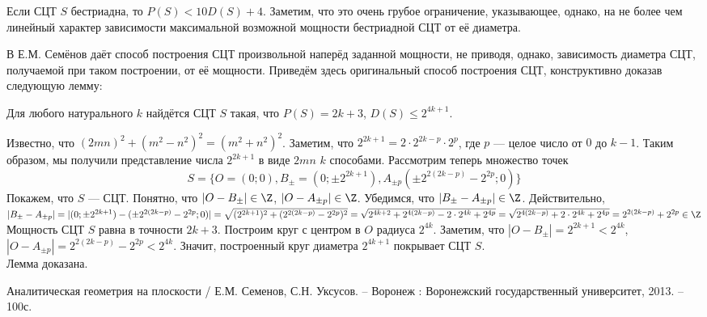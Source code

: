 \begin{sledstvie}
	Если СЦТ $S$ бестриадна, то
	$P(S) < 10 D(S)+4$.
	Заметим, что это очень грубое ограничение, указывающее, однако,
	на не более чем линейный характер зависимости максимальной возможной мощности  бестриадной СЦТ от её диаметра.
\end{sledstvie}

В \cite{angem1kurs} Е.М. Семёнов даёт способ построения СЦТ произвольной наперёд заданной мощности, не приводя, однако, зависимость диаметра СЦТ, получаемой при таком построении, от её мощности.
Приведём здесь оригинальный способ построения СЦТ, конструктивно доказав следующую лемму:

\begin{lemma}
	Для любого натурального $k$ найдётся СЦТ $S$ такая, что $P(S)=2k+3$, $D(S)\leq 2^{4k+1}$.
\end{lemma}

\dokvo
	Известно, что $(2mn)^2+(m^2-n^2)^2=(m^2+n^2)^2$.
	Заметим, что $2^{2k+1} = 2 \cdot 2^{2k-p} \cdot 2^p$, где $p$ --- целое число от $0$ до $k-1$.
	Таким образом, мы получили представление числа $2^{2k+1}$ в виде $2mn$ $k$ способами.
	Рассмотрим теперь множество точек
	$$
		S=\{O=(0;0),B_\pm=(0;\pm 2^{2k+1}),A_{\pm p}(\pm 2^{2(2k-p)}-2^{2p};0)\}
	$$
	Покажем, что $S$ --- СЦТ.
	Понятно, что $|O-B_\pm|\in\Z$, $|O-A_{\pm p}|\in\Z$.
	Убедимся, что $|B_\pm-A_{\pm p}|\in\Z$.
	Действительно, $|B_\pm-A_{\pm p}|=|(0;\pm 2^{2k+1}) - (\pm 2^{2(2k-p)}-2^{2p};0)| = \sqrt{(2^{2k+1})^2+(2^{2(2k-p)}-2^{2p})^2}=
	\sqrt{2^{4k+2}+2^{4(2k-p)}-2\cdot 2^{4k}+2^{4p}}=\sqrt{2^{4(2k-p)}+2\cdot 2^{4k}+2^{4p}}=2^{2(2k-p)}+2^{2p}\in\Z$
	Мощность СЦТ $S$ равна в точности $2k+3$.
	Построим круг с центром в $O$ радиуса $2^{4k}$.
	Заметим, что $|O-B_\pm|=2^{2k+1}<2^{4k}$, $|O-A_{\pm p}| = 2^{2(2k-p)}-2^{2p} < 2^{4k}$.
	Значит, построенный круг диаметра $2^{4k+1}$ покрывает СЦТ $S$.
\\ Лемма доказана.


\begin{thebibliography}{99}

 Аналитическая геометрия на плоскости / Е.М. Семенов, С.Н. Уксусов. – Воронеж : Воронежский государственный университет, 2013. – 100с.

\end{thebibliography}
